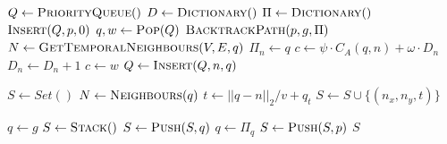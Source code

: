 \begin{algorithm}[ht]
    \caption{$\Function{SearchGraph}(V, E, R, A, p, g)$}
    \label{algo:search}
    \begin{algorithmic}[1]
        \setcounter{ALC@line}{0}
        \vspace*{1mm}
        \STATE $Q \leftarrow \Function{PriorityQueue}()$
        \STATE $D \leftarrow \Function{Dictionary}()$
        \STATE $\Pi \leftarrow \Function{Dictionary}()$
        \STATE $\Function{Insert}(Q, p, 0)$
            \STATE $q, w \leftarrow \Function{Pop}(Q)$
                \RETURN $\Function{BacktrackPath}(p, g, \Pi)$
            \ENDIF
            \STATE $N \leftarrow \Function{GetTemporalNeighbours}(V, E, q)$
                \STATE $\Pi_n \leftarrow q$
                \STATE $c \leftarrow \psi \cdot C_A(q, n) + \omega \cdot D_n$
                \STATE $D_n \leftarrow D_n + 1$
                    \STATE $c \leftarrow w$
                \ENDIF
                \STATE $Q \leftarrow \Function{Insert}(Q, n, q)$
            \ENDFOR
        \ENDWHILE
    \end{algorithmic}
\end{algorithm}

\begin{algorithm}[ht]
    \caption{$\Function{GetTemporalNeighbours}(V, E, q)$}
    \label{algo:backtrack}
    \begin{algorithmic}[1]
        \setcounter{ALC@line}{0}
        \vspace*{1mm}
        \STATE $S \leftarrow Set()$
        \STATE $N \leftarrow \Function{Neighbours}(q)$
            \STATE $t \leftarrow ||q - n||_2 / v + q_t$
            \STATE $S \leftarrow S \cup \{(n_x, n_y, t)\}$
        \ENDFOR
    \end{algorithmic}
\end{algorithm}

\begin{algorithm}[ht]
    \caption{$\Function{BacktrackPath}(p, g, \Pi)$}
    \label{algo:backtrack}
    \begin{algorithmic}[1]
        \setcounter{ALC@line}{0}
        \vspace*{1mm}
        \STATE $q \leftarrow g$
        \STATE $S \leftarrow \Function{Stack}()$
            \STATE $S \leftarrow \Function{Push}(S, q)$
            \STATE $q \leftarrow \Pi_q$
        \ENDWHILE
        \STATE $S \leftarrow \Function{Push}(S, p)$
        \RETURN $S$
    \end{algorithmic}
\end{algorithm}
